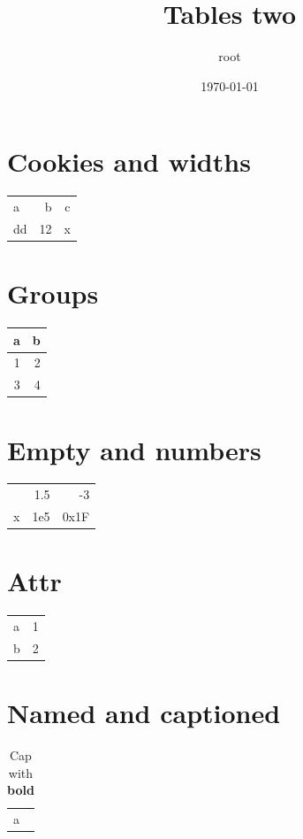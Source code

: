\documentclass[11pt]{article}
\author{root}
\date{\today}
\title{Tables two}
\begin{document}
\maketitle
\tableofcontents

\section{Cookies and widths}
\label{sec:org9fa3c8b}
\begin{center}
\begin{tabular}{lrc}
a & b & c\\[0pt]
dd & 12 & x\\[0pt]
\end{tabular}
\end{center}
\section{Groups}
\label{sec:org50e5b38}
\begin{center}
\begin{tabular}{rr}
a & b\\[0pt]
\hline
1 & 2\\[0pt]
\hline
3 & 4\\[0pt]
\end{tabular}
\end{center}
\section{Empty and numbers}
\label{sec:orga4615a4}
\begin{center}
\begin{tabular}{lrr}
 & 1.5 & -3\\[0pt]
x & 1e5 & 0x1F\\[0pt]
\end{tabular}
\end{center}
\section{Attr}
\label{sec:org715e5ba}
\begin{center}
\begin{tabular}{|l|r|}
a & 1\\[0pt]
b & 2\\[0pt]
\end{tabular}
\end{center}
\section{Named and captioned}
\label{sec:orgfb397fc}
\begin{table}[htbp]
\caption{\label{tab:org7f1c90c}Cap with \textbf{bold}}
\centering
\begin{tabular}{l}
a\\[0pt]
\end{tabular}
\end{table}
\end{document}
